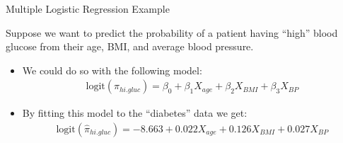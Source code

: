 \documentclass{beamer}\usepackage[]{graphicx}\usepackage[]{color}
\begin{document}

\begin{frame}{Multiple Logistic Regression Example}
  


Suppose we want to predict the probability of a patient having ``high'' blood 
glucose from their age, BMI, and average blood pressure.
\vb
\begin{itemize}
\item We could do so with the following model:
  \begin{align*}
    \text{logit}(\pi_{hi.gluc}) = 
    \beta_0 + \beta_1 X_{age} + \beta_2 X_{BMI} + \beta_3 X_{BP}
  \end{align*}
\item By fitting this model to the ``diabetes'' data we get:
  \begin{align*}
    \text{logit}(\hat{\pi}_{hi.gluc}) = 
    -8.663 + 0.022 X_{age} + 0.126 X_{BMI} + 0.027 X_{BP}
  \end{align*}
\end{itemize}

\end{frame}

\end{document}
